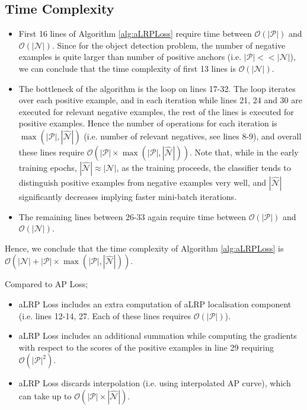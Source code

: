 \documentclass{article}
\begin{document}
\subsection{Time Complexity} 
\begin{itemize}
    \item First 16 lines of Algorithm \ref{alg:aLRPLoss} require time between $\mathcal{O}(|\mathcal{P}|)$ and $\mathcal{O}(|\mathcal{N}|)$. Since for the object detection problem, the number of negative examples is quite larger than number of positive anchors (i.e. $|\mathcal{P}| << |\mathcal{N}|$), we can conclude that the time complexity of first 13 lines is $\mathcal{O}(|\mathcal{N}|)$.
    \item  The bottleneck of the algorithm is the loop on lines 17-32. The loop iterates over each positive example, and in each iteration while lines 21, 24 and 30 are executed for relevant negative examples, the rest of the lines is executed for positive examples. Hence the number of operations for each iteration is $\max(|\mathcal{P}|, |\hat{\mathcal{N}}|)$ (i.e. number of relevant negatives, see lines 8-9), and overall these lines require $\mathcal{O}(|\mathcal{P}| \times \max(|\mathcal{P}|, |\hat{\mathcal{N}}|))$.  Note that, while in the early training epochs, $|\hat{\mathcal{N}}| \approx |\mathcal{N}|$, as the training proceeds, the classifier tends to distinguish positive examples from negative examples very well, and $|\hat{\mathcal{N}}|$ significantly decreases implying faster mini-batch iterations. 
    \item The remaining lines between 26-33 again require time between $\mathcal{O}(|\mathcal{P}|)$ and $\mathcal{O}(|\mathcal{N}|)$.
\end{itemize}
 Hence, we conclude that the time complexity of Algorithm \ref{alg:aLRPLoss} is $\mathcal{O}(|\mathcal{N}|+|\mathcal{P}| \times \max(|\mathcal{P}|, |\hat{\mathcal{N}}|))$.

Compared to AP Loss; 
\begin{itemize}
    \item aLRP Loss includes an extra computation of aLRP localisation component (i.e. lines 12-14, 27. Each of these lines requires $\mathcal{O}(|\mathcal{P}|)$).
    \item aLRP Loss includes an additional summation while computing the gradients with respect to the scores of the positive examples in line 29 requiring $\mathcal{O}(|\mathcal{P}|^2)$.
    \item aLRP Loss discards interpolation (i.e. using interpolated AP curve), which can take up to $\mathcal{O}(|\mathcal{P}| \times |\hat{\mathcal{N}}|)$.
\end{itemize}
\end{document}
